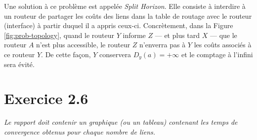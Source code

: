 \documentclass[11pt]{article}
\begin{document}
Une solution à ce problème est appelée \textit{Split Horizon}. Elle consiste à interdire à un routeur de partager les coûts des liens dans la table de routage avec le routeur (interface) à partir duquel il a appris ceux-ci. Concrètement, dans la Figure \ref{fig:prob-topology}, quand le routeur $Y$ informe $Z$ --- et plus tard $X$ --- que le routeur $A$ n'est plus accessible, le routeur $Z$ n'enverra pas à $Y$ les coûts associés à ce routeur $Y$. De cette façon, $Y$ conservera $D_{y}(a)=+\infty$ et le comptage à l'infini sera évité.



\section{Exercice 2.6}
\textit{Le rapport doit contenir un graphique (ou un tableau) contenant les temps de convergence obtenus
pour chaque nombre de liens.}

\vspace{10px}
\begin{center}
\end{center}

\vspace*{\fill}
\end{document}

